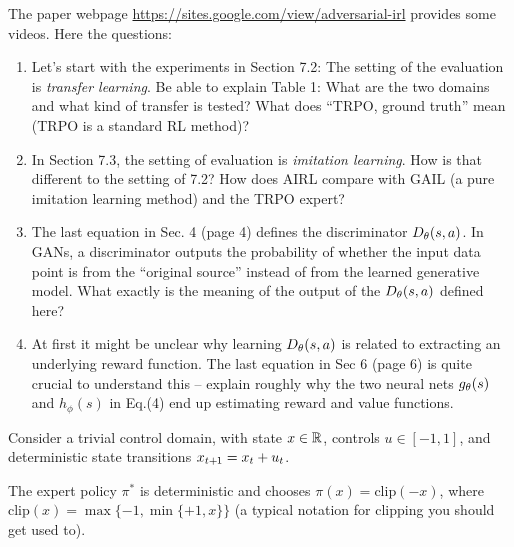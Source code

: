 The paper webpage
{\urlfont\url{https://sites.google.com/view/adversarial-irl}} provides
some videos. Here the questions:
\begin{enumerate}
\item Let's start with the experiments in Section 7.2: The setting of
the evaluation is \emph{transfer learning}. Be able to explain Table
1: What are the two domains and what kind of transfer is tested? What
does ``TRPO, ground truth'' mean (TRPO is a standard RL method)?


\item In Section 7.3, the setting of evaluation is \emph{imitation
learning}. How is that different to the setting of 7.2? How does AIRL
compare with GAIL (a pure imitation learning method) and the TRPO expert?


\item The last equation in Sec. 4 (page 4) defines the discriminator
$D_\theta(s,a)$. In GANs, a discriminator outputs the probability of whether
the input data point is from the ``original source'' instead of from the
learned generative model. What exactly is the meaning of the output of
the $D_\theta(s,a)$ defined here?



\item At first it might be unclear why learning $D_\theta(s,a)$ is related
to extracting an underlying reward function. The last equation in Sec
6 (page 6) is quite crucial to understand this -- explain roughly why
the two neural nets $g_\theta(s)$ and $h_\phi(s)$ in Eq.(4) end up estimating
reward and value functions.

\end{enumerate}



Consider a trivial control domain, with state $x\in{\mathbb{R}}$, controls
$u\in[-1,1]$, and deterministic state transitions $x_{t{{\hspace*{-.0pt}\text{\rm +}\hspace*{-.5pt}}1}} = x_t +
u_t$.

The expert policy $\pi^*$ is deterministic and chooses $\pi(x)
= \text{clip}(-x)$, where $\text{clip}(x) = \max\{-1, \min\{+1,x\}\}$
(a typical notation for clipping you should get used to).

